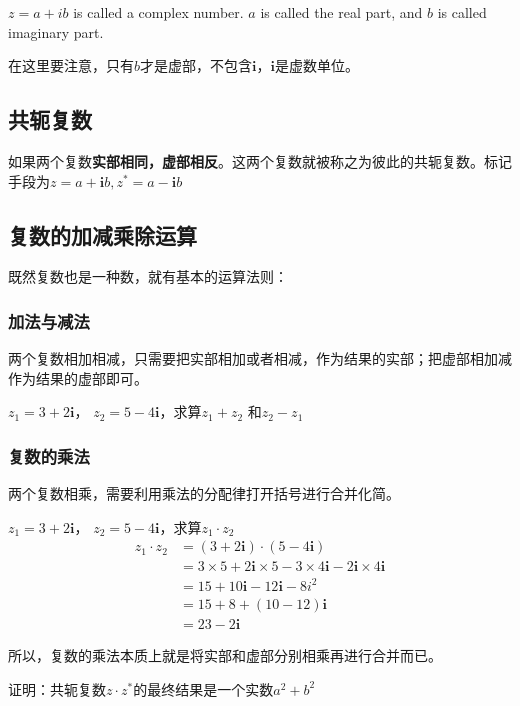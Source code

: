 \begin{definition}
 $z=a+ib$ is called a complex number. $a$ is called the real part, and $b$ is called imaginary part.
\end{definition}
在这里要注意，只有$b$才是虚部，不包含$\mathbf{i}$，$\mathbf{i}$是虚数单位。

\subsection*{共轭复数}
如果两个复数\textbf{实部相同，虚部相反}。这两个复数就被称之为彼此的共轭复数。标记手段为$z=a+\mathbf{i}b, z^*=a-\mathbf{i}b$

\subsection*{复数的加减乘除运算}
既然复数也是一种数，就有基本的运算法则：

\subsubsection*{加法与减法}
两个复数相加相减，只需要把实部相加或者相减，作为结果的实部；把虚部相加减作为结果的虚部即可。
\begin{TaskBox}
 $z_1=3+2\mathbf{i}$， $z_2=5-4\mathbf{i}$，求算$z_1+z_2$ 和$z_2-z_1$
\end{TaskBox}

\subsubsection*{复数的乘法}
两个复数相乘，需要利用乘法的分配律打开括号进行合并化简。
\begin{ExampleBox}
 $z_1=3+2\mathbf{i}$， $z_2=5-4\mathbf{i}$，求算$z_1\cdot z_2$
\tcblower
 \begin{align*}
 	z_1\cdot z_2 &= (3+2\mathbf{i})\cdot (5-4\mathbf{i}) \\
 				 &= 3\times 5 +2\mathbf{i}\times 5-3\times 4\mathbf{i}-2\mathbf{i}\times 4\mathbf{i}\\
 				 &=15 +10\mathbf{i} -12\mathbf{i} -8i^2\\
 				 &=15+8 +(10-12)\mathbf{i}\\
 				 &=23-2\mathbf{i}
 \end{align*}
\end{ExampleBox}

所以，复数的乘法本质上就是将实部和虚部分别相乘再进行合并而已。

\begin{TaskBox}
 证明：共轭复数$z\cdot z^*$的最终结果是一个实数$a^2+b^2$
\end{TaskBox}

